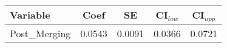 \begin{tabular}{lcccc}
\hline
Variable & Coef & SE & CI$_{low}$ & CI$_{upp}$ \\
\hline
Post_Merging & 0.0543 & 0.0091 & 0.0366 & 0.0721 \\
\hline
\end{tabular}
